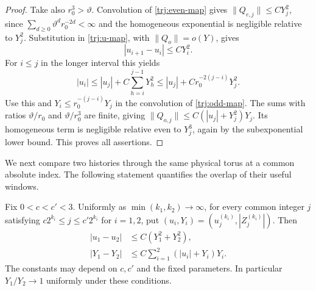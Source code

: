 \begin{proof}
Take also \(r_0^3>\vartheta\).  Convolution of
\eqref{trj:even-map} gives \(\|Q_{e,j}\|\le CY_j^2\), since
\(\sum_{d\ge0}\vartheta^d r_0^{-2d}<\infty\) and the homogeneous
exponential is negligible relative to \(Y_j^2\).  Substitution in
\eqref{trj:u-map}, with \(\|Q_o\|=o(Y)\), gives
\begin{equation}\label{trj:u-drift}
                         |u_{i+1}-u_i|\le C Y_i^2.
\end{equation}
For \(i\le j\) in the longer interval this yields
\[
 |u_i|\le |u_j|+C\sum_{h=i}^{j-1}Y_h^2
       \le |u_j|+C r_0^{-2(j-i)}Y_j^2.
\]
Use this and \(Y_i\le r_0^{-(j-i)}Y_j\) in the convolution of
\eqref{trj:odd-map}.  The sums with ratios
\(\vartheta/r_0\) and \(\vartheta/r_0^3\) are finite, giving
\(\|Q_{o,j}\|\le C(|u_j|+Y_j^2)Y_j\).  Its homogeneous term is
negligible relative even to \(Y_j^3\), again by the subexponential
lower bound.  This proves all assertions.
\end{proof}

We next compare two histories through the same physical torus at a
common absolute index.  The following statement quantifies the
overlap of their useful windows.

\begin{lemma}\label{trj:overlap}
Fix \(0<c<c'<3\).  Uniformly as \(\min(k_1,k_2)\to\infty\), for
every common integer \(j\) satisfying
\(c2^{k_i}\le j\le c'2^{k_i}\) for \(i=1,2\), put
\((u_i,Y_i)=(u_j^{(k_i)},|Z_j^{(k_i)}|)\).  Then
\begin{equation}\label{trj:overlap-bounds}
 \begin{split}
 |u_1-u_2|&\le C(Y_1^2+Y_2^2),\\
 |Y_1-Y_2|&\le C\sum_{i=1}^2(|u_i|+Y_i)Y_i.
 \end{split}
\end{equation}
The constants may depend on \(c,c'\) and the fixed parameters.
In particular \(Y_1/Y_2\to1\) uniformly under these conditions.
\end{lemma}

